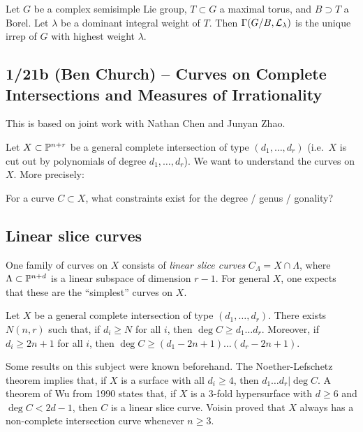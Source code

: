 \documentclass{article}
\begin{document}
\begin{thm}
	Let $G$ be a complex semisimple Lie group, $T \subset G$ a maximal torus, and $B \supset T$ a Borel.
	Let $\lambda$ be a dominant integral weight of $T$.
	Then $\Gamma(G / B, \mathcal{L}_\lambda)$ is the unique irrep of $G$ with highest weight $\lambda$.
\end{thm}

\subsection{1/21b (Ben Church) -- Curves on Complete Intersections and Measures of Irrationality}

This is based on joint work with Nathan Chen and Junyan Zhao.

Let $X \subset \mathbb{P}^{n+r}$ be a general complete intersection of type $(d_1, \dots, d_r)$ (i.e.\ $X$ is cut out by polynomials of degree $d_1, \dots, d_r$).
We want to understand the curves on $X$.
More precisely:

\begin{qn}
	For a curve $C \subset X$, what constraints exist for the degree / genus / gonality?
\end{qn}

\subsection{Linear slice curves}

One family of curves on $X$ consists of \emph{linear slice curves} $C_\Lambda = X \cap \Lambda$, where $\Lambda \subset \mathbb{P}^{n+d}$ is a linear subspace of dimension $r - 1$.
For general $X$, one expects that these are the ``simplest'' curves on $X$.

\begin{thm}
	Let $X$ be a general complete intersection of type $(d_1, \dots, d_r)$.
	There exists $N(n, r)$ such that, if $d_i \geq N$ for all $i$, then $\deg C \geq d_1 \dots d_r$.
	Moreover, if $d_i \geq 2n + 1$ for all $i$, then $\deg C \geq (d_1 - 2n + 1) \dots (d_r - 2n + 1)$.
\end{thm}

Some results on this subject were known beforehand.
The Noether-Lefschetz theorem implies that, if $X$ is a surface with all $d_i \geq 4$, then $d_1 \dots d_r | \deg C$.
A theorem of Wu from 1990 states that, if $X$ is a 3-fold hypersurface with $d \geq 6$ and $\deg C < 2d - 1$, then $C$ is a linear slice curve.
Voisin proved that $X$ always has a non-complete intersection curve whenever $n \geq 3$.
\end{document}

